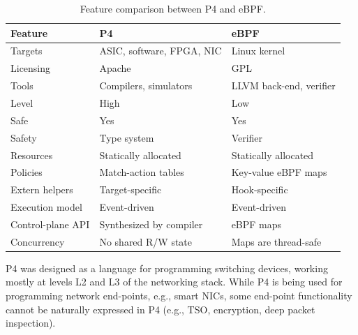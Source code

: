 \begin{table}[h]
  \footnotesize
  \begin{center}
  \begin{tabular}{|l|l|l|} \hline
    \textbf{Feature} & \textbf{P4} & \textbf{eBPF} \\ \hline \hline
    Targets & ASIC, software, FPGA, NIC & Linux kernel \\ \hline
    Licensing & Apache & GPL \\ \hline
    Tools & Compilers, simulators & LLVM back-end, verifier \\ \hline
    Level & High & Low \\ \hline
    Safe  & Yes & Yes \\ \hline
    Safety & Type system & Verifier \\ \hline
    Resources & Statically allocated & Statically allocated \\ \hline
    Policies & Match-action tables & Key-value eBPF maps \\ \hline
    Extern helpers & Target-specific & Hook-specific \\ \hline
    Execution model & Event-driven & Event-driven \\ \hline
    Control-plane API & Synthesized by compiler & eBPF maps \\ \hline
    Concurrency & No shared R/W state & Maps are thread-safe \\ \hline
  \end{tabular}
  \caption{Feature comparison between P4 and eBPF.}\label{table:compare}
  \end{center}
\end{table}

P4 was designed as a language for programming switching devices,
working mostly at levels L2 and L3 of the networking stack.  While P4
is being used for programming network end-points, e.g., smart NICs,
some end-point functionality cannot be naturally expressed in P4
(e.g., TSO, encryption, deep packet inspection).

